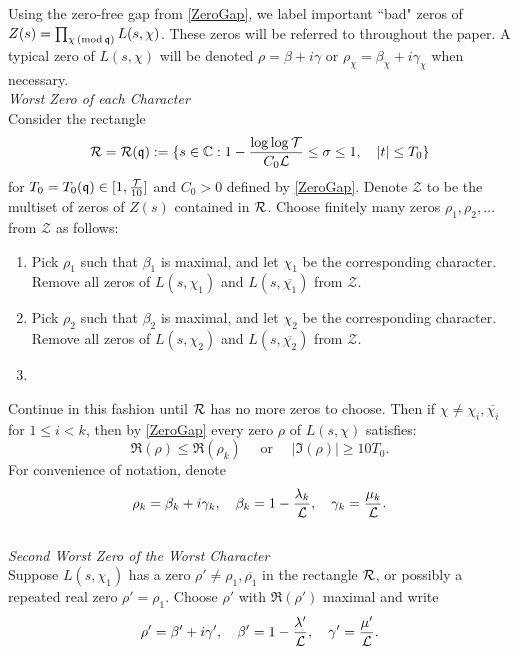 \documentclass[12pt,psamsfonts]{amsart}
\theoremstyle{definition}
\theoremstyle{remark}
\numberwithin{equation}{section}
\newcounter{notation}
\begin{document}
Using the zero-free gap from \cref{ZeroGap}, we label important ``bad" zeros of $Z(s) = \prod_{\chi \, (\mathrm{mod} {\, \mathfrak{q}})} L(s,\chi)$.  
These zeros will be referred to throughout the paper. A typical zero of $L(s,\chi)$ will be denoted $\rho = \beta + i\gamma$ or $\rho_{\chi} = \beta_{\chi} + i\gamma_{\chi}$ when necessary. \\

\noindent
	 \emph{Worst Zero of each Character} \\
	Consider the rectangle
	\[
	\mathcal{R} = \mathcal{R}(\mathfrak{q}) := \{ s \in \mathbb{C} : 1-\frac{\log \log \mathcal{T}}{C_0\mathcal{L}} \leq \sigma \leq 1, \quad |t| \leq T_0 \}
	\]
	for $T_0 = T_0(\mathfrak{q}) \in [1, \tfrac{\mathcal{T}}{10}]$ and $C_0 > 0$ defined by \cref{ZeroGap}. Denote $\mathcal{Z}$ to be the multiset of zeros of $Z(s)$ contained in $\mathcal{R}$. Choose finitely many zeros $\rho_1, \rho_2,\dots$ from $\mathcal{Z}$ as follows:
	\begin{enumerate}
		\item Pick $\rho_1$ such that $\beta_1$ is maximal, and let $\chi_1$ be the corresponding character. Remove all zeros of $L(s,\chi_1)$ and $L(s,\overline{\chi_1})$ from $\mathcal{Z}$. 
		\item Pick $\rho_2$ such that $\beta_2$ is maximal, and let $\chi_2$ be the corresponding character. Remove all zeros of $L(s,\chi_2)$ and $L(s,\overline{\chi_2})$ from $\mathcal{Z}$.
		\item[\vdots]
	\end{enumerate}
	Continue in this fashion until $\mathcal{R}$ has no more zeros to choose. Then if $\chi \neq \chi_i, \overline{\chi_i}$ for $1 \leq i < k$, then by \cref{ZeroGap} every zero $\rho$ of $L(s,\chi)$ satisfies:
	\begin{equation}
	\Re(\rho) \leq \Re(\rho_k) \quad \text{ or } \quad |\Im(\rho)| \geq 10T_0.
	\label{ZeroGapProperty}
	\end{equation}
	For convenience of notation, denote
	\[
	\rho_k = \beta_k + i\gamma_k, \quad \beta_k = 1 - \frac{\lambda_k}{\mathcal{L}}, \quad \gamma_k = \frac{\mu_k}{\mathcal{L}}. 
	\]
	$ $ \\
	\emph{Second Worst Zero of the Worst Character}\\
	Suppose $L(s,\chi_1)$ has a zero $\rho' \neq \rho_1, \overline{\rho_1}$ in the rectangle $\mathcal{R}$, or possibly a repeated real zero $\rho' = \rho_1$. Choose $\rho'$ with $\Re(\rho')$ maximal and write
	\[
	\rho' = \beta' + i\gamma', \quad \beta' = 1 - \frac{\lambda'}{\mathcal{L}}, \quad \gamma' = \frac{\mu'}{\mathcal{L}}. 
	\]

\end{document}
